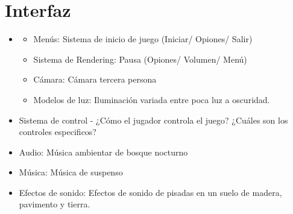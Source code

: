 \section{Interfaz}
\begin{itemize}
	\item
	      \begin{itemize}
		      \item Menús: Sistema de inicio de juego (Iniciar/ Opiones/ Salir)
		      \item Sistema de Rendering: Pausa (Opiones/ Volumen/ Menú)
		      \item Cámara: Cámara tercera persona
		      \item Modelos de luz: Iluminación variada entre poca luz a oscuridad.
	      \end{itemize}
	\item Sistema de control - ¿Cómo el jugador controla el juego? ¿Cuáles son los controles especificos?
	\item Audio: Música ambientar de bosque nocturno
	\item Música: Música de suspenso
	\item Efectos de sonido: Efectos de sonido de pisadas en un suelo de madera, pavimento y tierra.
\end{itemize}

